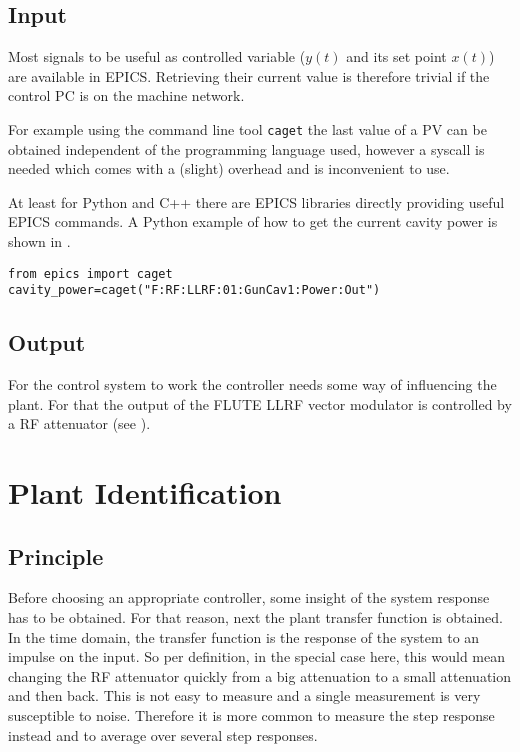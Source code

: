 \subsection{Input}
Most signals to be useful as controlled variable ($y(t)$ and its set point $x(t)$) are available in EPICS. Retrieving their current value is therefore trivial if the control PC is on the machine network.

For example using the command line tool \texttt{caget} the last value of a PV can be obtained independent of the programming language used, however a syscall is needed which comes with a (slight) overhead and is inconvenient to use.

At least for Python and C++ there are EPICS libraries directly providing useful EPICS commands. A Python example of how to get the current cavity power is shown in .

\begin{lstlisting}[style=python,caption = Get an EPICS PV with python, label = lst:own-work-epicscaget]
from epics import caget
cavity_power=caget("F:RF:LLRF:01:GunCav1:Power:Out")
\end{lstlisting}

\subsection{Output}
For the control system to work the controller needs some way of influencing the plant. For that the output of the FLUTE LLRF vector modulator is controlled by a RF attenuator (see ). %

\section{Plant Identification}
\subsection{Principle}
Before choosing an appropriate controller, some insight of the system response has to be obtained. For that reason, next the plant transfer function is obtained. In the time domain, the transfer function is the response of the system to an impulse on the input. So per definition, in the special case here, this would mean changing the RF attenuator quickly from a big attenuation to a small attenuation and then back. This is not easy to measure and a single measurement is very susceptible to noise. Therefore it is more common to measure the step response instead and to average over several step responses.

